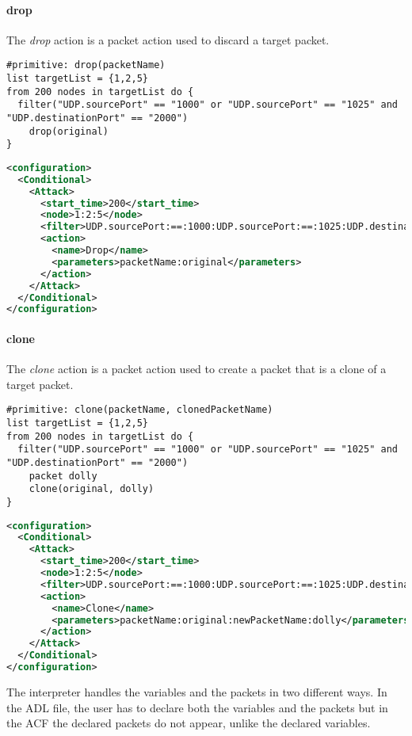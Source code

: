 \paragraph{drop}
The \emph{drop} action is a packet action used to discard a target packet.
%
\begin{lstlisting}[language={asl},caption={ASL drop example}]
#primitive: drop(packetName)
list targetList = {1,2,5}
from 200 nodes in targetList do {
  filter("UDP.sourcePort" == "1000" or "UDP.sourcePort" == "1025" and "UDP.destinationPort" == "2000")
    drop(original)
}
\end{lstlisting}
%
\begin{lstlisting}[language={xml},caption={Interpreter output}]
<configuration>
  <Conditional>
    <Attack>
      <start_time>200</start_time>
      <node>1:2:5</node>
      <filter>UDP.sourcePort:==:1000:UDP.sourcePort:==:1025:UDP.destinationPort:==:2000:AND:OR</filter>
      <action>
        <name>Drop</name>
        <parameters>packetName:original</parameters>
      </action>
    </Attack>
  </Conditional>
</configuration>
\end{lstlisting}

\paragraph{clone}
The \emph{clone} action is a packet action used to create a packet that is a clone of a target packet.
%
\begin{lstlisting}[language={asl},caption={ASL clone example}]
#primitive: clone(packetName, clonedPacketName)
list targetList = {1,2,5}
from 200 nodes in targetList do {
  filter("UDP.sourcePort" == "1000" or "UDP.sourcePort" == "1025" and "UDP.destinationPort" == "2000")
    packet dolly
    clone(original, dolly)
}
\end{lstlisting}
%
\begin{lstlisting}[language={xml},caption={Interpreter output}]
<configuration>
  <Conditional>
    <Attack>
      <start_time>200</start_time>
      <node>1:2:5</node>
      <filter>UDP.sourcePort:==:1000:UDP.sourcePort:==:1025:UDP.destinationPort:==:2000:AND:OR</filter>
      <action>
        <name>Clone</name>          
        <parameters>packetName:original:newPacketName:dolly</parameters>                        
      </action>
    </Attack>
  </Conditional>
</configuration>
\end{lstlisting}
%
The interpreter handles the variables and the packets in two different ways. 
In the ADL file, the user has to declare both the variables and the packets but in the ACF the declared packets do not appear, unlike the declared variables.


